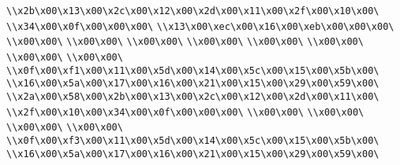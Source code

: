 \verb|\\x2b\x00\x13\x00\x2c\x00\x12\x00\x2d\x00\x11\x00\x2f\x00\x10\x00\|\newline
\verb|\\x34\x00\x0f\x00\x00\x00\|\newline
\verb|\\x13\x00\xec\x00\x16\x00\xeb\x00\x00\x00\|\newline
\verb|\\x00\x00\|\newline
\verb|\\x00\x00\|\newline
\verb|\\x00\x00\|\newline
\verb|\\x00\x00\|\newline
\verb|\\x00\x00\|\newline
\verb|\\x00\x00\|\newline
\verb|\\x00\x00\|\newline
\verb|\\x00\x00\|\newline
\verb|\\x0f\x00\xf1\x00\x11\x00\x5d\x00\x14\x00\x5c\x00\x15\x00\x5b\x00\|\newline
\verb|\\x16\x00\x5a\x00\x17\x00\x16\x00\x21\x00\x15\x00\x29\x00\x59\x00\|\newline
\verb|\\x2a\x00\x58\x00\x2b\x00\x13\x00\x2c\x00\x12\x00\x2d\x00\x11\x00\|\newline
\verb|\\x2f\x00\x10\x00\x34\x00\x0f\x00\x00\x00\|\newline
\verb|\\x00\x00\|\newline
\verb|\\x00\x00\|\newline
\verb|\\x00\x00\|\newline
\verb|\\x00\x00\|\newline
\verb|\\x0f\x00\xf3\x00\x11\x00\x5d\x00\x14\x00\x5c\x00\x15\x00\x5b\x00\|\newline
\verb|\\x16\x00\x5a\x00\x17\x00\x16\x00\x21\x00\x15\x00\x29\x00\x59\x00\|\newline
